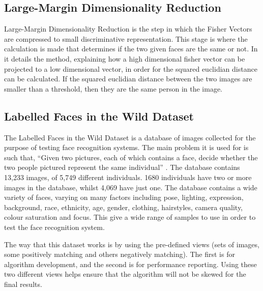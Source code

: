 \documentclass[12pt, a4paper]{article}
\begin{document}
\subsection*{Large-Margin Dimensionality Reduction}

Large-Margin Dimensionality Reduction is the step in which the Fisher Vectors are compressed to small discriminative representation. This stage is where the calculation is made that determines if the two given faces are the same or not. In \cite{highlbpsift} it details the method, explaining how a high dimensional fisher vector can be projected to a low dimensional vector, in order for the squared euclidian distance can be calculated. If the squared euclidian distance between the two images are smaller than a threshold, then they are the same person in the image.
        
  \subsection*{Labelled Faces in the Wild Dataset}

The Labelled Faces in the Wild Dataset is a database of images collected for the purpose of testing face recognition systems. The main problem it is used for is such that, “Given two pictures, each of which contains a face, decide whether the two people pictured represent the same individual” \cite{labelledFaces}. The database contains 13,233 images, of 5,749 different individuals. 1680 individuals have two or more images in the database, whilst 4,069 have just one. The database contains a wide variety of faces, varying on many factors including pose, lighting, expression, background, race, ethnicity, age, gender, clothing, hairstyles, camera quality, colour saturation and focus. This give a wide range of samples to use in order to test the face recognition system.

The way that this dataset works is by using the pre-defined views (sets of images, some positively matching and others negatively matching). The first is for algorithm development, and the second is for performance reporting. Using these two different views helps ensure that the algorithm will not be skewed for the final results.

               
 
        \newpage
 
        \begin{appendices}
 
        \end{appendices}       
       
       
        \newpage
 
        

\end{document}
